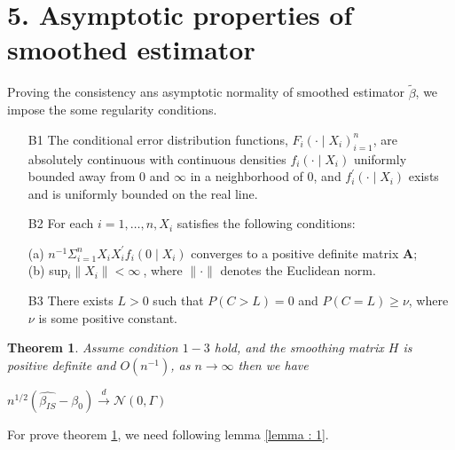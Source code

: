 \documentclass[12pt]{article}
\newtheorem{theorem}{Theorem}
\begin{document}
\section{5. Asymptotic properties of smoothed estimator}
	 Proving the consistency ans asymptotic normality of smoothed estimator $\tilde{\beta}$, we impose the some regularity conditions.
	 \begin{enumerate}
	 	\item[B1] The conditional error distribution functions, $F_{i}(\cdot\mid X_{i})^{n}_{i=1}$, are absolutely continuous with continuous densities $f_{i}(\cdot\mid X_{i})$ uniformly bounded away from $0$ and $\infty$ in a neighborhood of $0$, and $f_{i}^{\prime}(\cdot\mid X_{i})$ exists and is uniformly bounded on the real line.
	 	\item[B2] For each $i=1,\dots, n, X_{i}$ satisfies the following conditions:
	 	\begin{flushleft}
	 		(a) $n^{-1}\Sigma_{i=1}^{n} X_{i} X_{i}^{\prime}f_{i}(0\mid X_{i})$ converges to a positive definite matrix \textbf{A};\\
	 		(b) sup$_{i}\lVert X_{i} \rVert < \infty\ $, where $\lVert \cdot \rVert$ denotes the Euclidean norm.\\
	 	\end{flushleft}
	 	\item[B3] There exists $L>0$ such that $P(C>L)=0$ and $P(C=L)\geq\nu$, where $\nu$ is some positive constant.
 	\end{enumerate}
 	\begin{theorem} \label {thm : 1}
 		Assume condition $1-3$ hold, and the smoothing matrix $H$ is positive definite and $O(n^{-1})$, as $n\to\infty$ then we have\\
 		\begin{center}
 			$n^{1/2}(\hat{\beta_{IS}}-\beta_0) \xrightarrow{d} \mathcal{N}(0,\Gamma)$
 		\end{center}
 	\end{theorem}
 
 	For prove theorem \ref {thm : 1}, we need following lemma \ref {lemma : 1}.\\
 	
\end{document}
